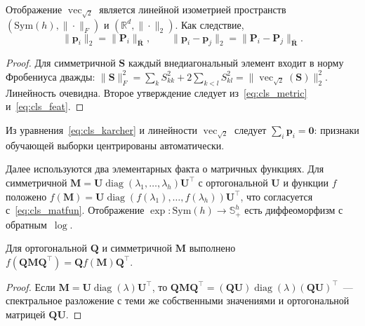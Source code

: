 \begin{lemma}\label{lem:cls_vec}
Отображение $\operatorname{vec}_{\sqrt{2}}$ является линейной изометрией пространств $(\mathrm{Sym}(h), \|\cdot\|_F)$ и $(\mathbb{R}^{d}, \|\cdot\|_2)$. Как следствие,
\begin{equation*}\|\mathbf{p}_i\|_2 = \|\mathbf{P}_i\|_{\bar{\mathbf{R}}},
\qquad
\|\mathbf{p}_i - \mathbf{p}_j\|_2 = \|\mathbf{P}_i - \mathbf{P}_j\|_{\bar{\mathbf{R}}} .
\end{equation*}
\end{lemma}
\begin{proof}
Для симметричной $\mathbf{S}$ каждый внедиагональный элемент входит в норму Фробениуса дважды:
$\|\mathbf{S}\|_F^2 = \sum_{k} S_{kk}^2 + 2\sum_{k<l} S_{kl}^2 = \|\operatorname{vec}_{\sqrt{2}}(\mathbf{S})\|_2^2$. Линейность очевидна. Второе утверждение следует из~\eqref{eq:cls_metric} и~\eqref{eq:cls_feat}.
\end{proof}

\begin{remark}
Из уравнения~\eqref{eq:cls_karcher} и линейности $\operatorname{vec}_{\sqrt{2}}$ следует $\sum_i \mathbf{p}_i = \mathbf{0}$: признаки обучающей выборки центрированы автоматически.
\end{remark}

Далее используются два элементарных факта о матричных функциях. Для симметричной $\mathbf{M} = \mathbf{U} \operatorname{diag}(\lambda_1, \ldots, \lambda_h) \mathbf{U}^{\top}$ с ортогональной $\mathbf{U}$ и функции $f$ положено $f(\mathbf{M}) = \mathbf{U} \operatorname{diag}(f(\lambda_1), \ldots, f(\lambda_h)) \mathbf{U}^{\top}$, что согласуется с~\eqref{eq:cls_matfun}. Отображение $\exp\colon \mathrm{Sym}(h) \to \mathbb{S}_{+}^{h}$ есть диффеоморфизм с обратным~$\log$.

\begin{lemma}\label{lem:cls_conj}
Для ортогональной $\mathbf{Q}$ и симметричной $\mathbf{M}$ выполнено $f(\mathbf{Q}\mathbf{M}\mathbf{Q}^{\top}) = \mathbf{Q} f(\mathbf{M}) \mathbf{Q}^{\top}$.
\end{lemma}
\begin{proof}
Если $\mathbf{M} = \mathbf{U}\operatorname{diag}(\lambda)\mathbf{U}^{\top}$, то $\mathbf{Q}\mathbf{M}\mathbf{Q}^{\top} = (\mathbf{Q}\mathbf{U})\operatorname{diag}(\lambda)(\mathbf{Q}\mathbf{U})^{\top}$~--- спектральное разложение с теми же собственными значениями и ортогональной матрицей $\mathbf{Q}\mathbf{U}$.
\end{proof}

